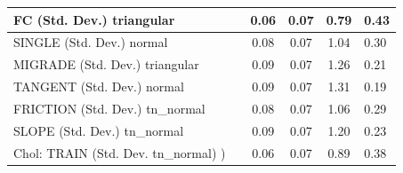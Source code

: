 \begin{table}
\begin{center}
\begin{tabular}{|l|l|c|c|c|l|}
			\hline
			FC (Std. Dev.) triangular &  & 0.06 & 0.07 & 0.79 & 0.43 \\
			\hline
			SINGLE (Std. Dev.) normal &  & 0.08 & 0.07 & 1.04 & 0.30 \\
			\hline
			MIGRADE (Std. Dev.) triangular &  & 0.09 & 0.07 & 1.26 & 0.21 \\
			\hline
			TANGENT (Std. Dev.) normal &  & 0.09 & 0.07 & 1.31 & 0.19 \\
			\hline
			FRICTION (Std. Dev.) tn_normal &  & 0.08 & 0.07 & 1.06 & 0.29 \\
			\hline
			SLOPE (Std. Dev.) tn_normal &  & 0.09 & 0.07 & 1.20 & 0.23 \\
			\hline
			 Chol: TRAIN (Std. Dev. tn_normal) ) &  & 0.06 & 0.07 & 0.89 & 0.38 \\
			\hline
		\end{tabular}
	\end{center}
\end{table}